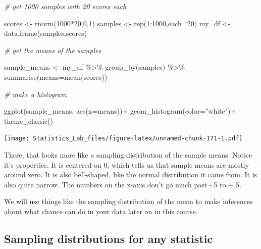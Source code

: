 \documentclass[
]{book}
\newenvironment{Shaded}{\begin{snugshade}}{\end{snugshade}}
\newcommand{\AttributeTok}[1]{\textcolor[rgb]{0.77,0.63,0.00}{#1}}
\newcommand{\CommentTok}[1]{\textcolor[rgb]{0.56,0.35,0.01}{\textit{#1}}}
\newcommand{\DecValTok}[1]{\textcolor[rgb]{0.00,0.00,0.81}{#1}}
\newcommand{\FunctionTok}[1]{\textcolor[rgb]{0.00,0.00,0.00}{#1}}
\newcommand{\NormalTok}[1]{#1}
\newcommand{\OtherTok}[1]{\textcolor[rgb]{0.56,0.35,0.01}{#1}}
\newcommand{\SpecialCharTok}[1]{\textcolor[rgb]{0.00,0.00,0.00}{#1}}
\newcommand{\StringTok}[1]{\textcolor[rgb]{0.31,0.60,0.02}{#1}}
\begin{document}
\begin{Shaded}
\begin{Highlighting}[]
\CommentTok{\# get 1000 samples with 20 scores each}

\NormalTok{scores }\OtherTok{\textless{}{-}} \FunctionTok{rnorm}\NormalTok{(}\DecValTok{1000}\SpecialCharTok{*}\DecValTok{20}\NormalTok{,}\DecValTok{0}\NormalTok{,}\DecValTok{1}\NormalTok{)}
\NormalTok{samples }\OtherTok{\textless{}{-}} \FunctionTok{rep}\NormalTok{(}\DecValTok{1}\SpecialCharTok{:}\DecValTok{1000}\NormalTok{,}\AttributeTok{each=}\DecValTok{20}\NormalTok{)}
\NormalTok{my\_df }\OtherTok{\textless{}{-}} \FunctionTok{data.frame}\NormalTok{(samples,scores)}

\CommentTok{\# get the means of the samples}

\NormalTok{sample\_means }\OtherTok{\textless{}{-}}\NormalTok{ my\_df }\SpecialCharTok{\%\textgreater{}\%}
                \FunctionTok{group\_by}\NormalTok{(samples) }\SpecialCharTok{\%\textgreater{}\%}
                \FunctionTok{summarise}\NormalTok{(}\AttributeTok{means=}\FunctionTok{mean}\NormalTok{(scores))}

\CommentTok{\# make a histogram}

 \FunctionTok{ggplot}\NormalTok{(sample\_means, }\FunctionTok{aes}\NormalTok{(}\AttributeTok{x=}\NormalTok{means))}\SpecialCharTok{+}
  \FunctionTok{geom\_histogram}\NormalTok{(}\AttributeTok{color=}\StringTok{"white"}\NormalTok{)}\SpecialCharTok{+}
  \FunctionTok{theme\_classic}\NormalTok{()}
\end{Highlighting}
\end{Shaded}

\texttt{[image: Statistics\_Lab\_files/figure-latex/unnamed-chunk-171-1.pdf]}

There, that looks more like a sampling distribution of the sample means. Notice it's properties. It is centered on 0, which tells us that sample means are mostly around zero. It is also bell-shaped, like the normal distribution it came from. It is also quite narrow. The numbers on the x-axis don't go much past -.5 to +.5.

We will use things like the sampling distribution of the mean to make inferences about what chance can do in your data later on in this course.

\hypertarget{sampling-distributions-for-any-statistic}{%
\subsection{Sampling distributions for any statistic}\label{sampling-distributions-for-any-statistic}}
\end{document}
